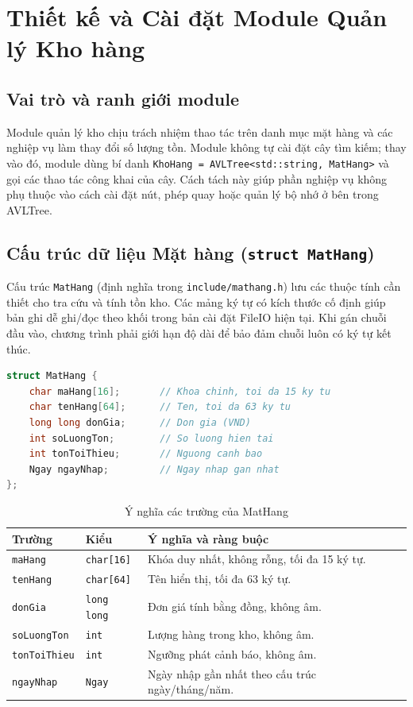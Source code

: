 \section{Thiết kế và Cài đặt Module Quản lý Kho hàng}

\subsection{Vai trò và ranh giới module}
Module quản lý kho chịu trách nhiệm thao tác trên danh mục mặt hàng và các nghiệp vụ làm thay đổi số lượng tồn. Module không tự cài đặt cây tìm kiếm; thay vào đó, module dùng bí danh \texttt{KhoHang = AVLTree<std::string, MatHang>} và gọi các thao tác công khai của cây. Cách tách này giúp phần nghiệp vụ không phụ thuộc vào cách cài đặt nút, phép quay hoặc quản lý bộ nhớ ở bên trong AVLTree.

\subsection{Cấu trúc dữ liệu Mặt hàng (\texttt{struct MatHang})}
Cấu trúc \texttt{MatHang} (định nghĩa trong \texttt{include/mathang.h}) lưu các thuộc tính cần thiết cho tra cứu và tính tồn kho. Các mảng ký tự có kích thước cố định giúp bản ghi dễ ghi/đọc theo khối trong bản cài đặt FileIO hiện tại. Khi gán chuỗi đầu vào, chương trình phải giới hạn độ dài để bảo đảm chuỗi luôn có ký tự kết thúc.
\begin{lstlisting}[language=C++,caption={Cấu trúc dữ liệu mặt hàng (rút gọn theo định nghĩa dự án)}]
struct MatHang {
    char maHang[16];       // Khoa chinh, toi da 15 ky tu
    char tenHang[64];      // Ten, toi da 63 ky tu
    long long donGia;      // Don gia (VND)
    int soLuongTon;        // So luong hien tai
    int tonToiThieu;       // Nguong canh bao
    Ngay ngayNhap;         // Ngay nhap gan nhat
};
\end{lstlisting}

\begin{table}[H]
\centering
\caption{Ý nghĩa các trường của MatHang}
\label{tab:mathang_fields}
\small
\begin{tabular}{@{}p{3cm}p{3cm}p{6.7cm}@{}}
\toprule
\textbf{Trường} & \textbf{Kiểu} & \textbf{Ý nghĩa và ràng buộc} \\
\midrule
\texttt{maHang} & \texttt{char[16]} & Khóa duy nhất, không rỗng, tối đa 15 ký tự. \\
\texttt{tenHang} & \texttt{char[64]} & Tên hiển thị, tối đa 63 ký tự. \\
\texttt{donGia} & \texttt{long long} & Đơn giá tính bằng đồng, không âm. \\
\texttt{soLuongTon} & \texttt{int} & Lượng hàng trong kho, không âm. \\
\texttt{tonToiThieu} & \texttt{int} & Ngưỡng phát cảnh báo, không âm. \\
\texttt{ngayNhap} & \texttt{Ngay} & Ngày nhập gần nhất theo cấu trúc ngày/tháng/năm. \\
\bottomrule
\end{tabular}
\end{table}

